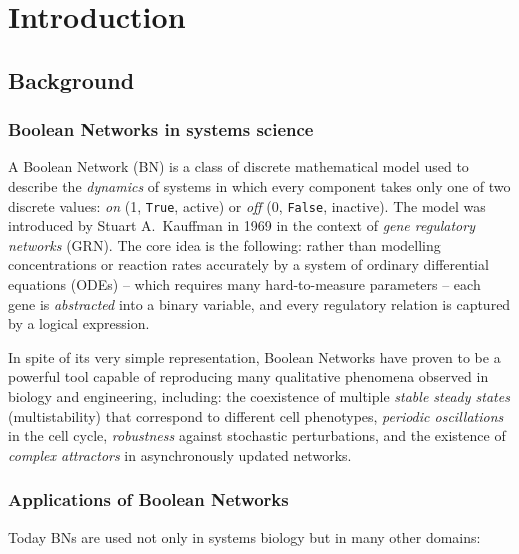\documentclass[oneside,final]{hcmut-report}
\begin{document}
  \cleardoublepage
  \listoffigures

  \cleardoublepage
  \listoftables
\endgroup

\cleardoublepage
\clearpage
{}
\setcounter{page}{1}

\section{Introduction}\label{sec:intro}

\subsection{Background}\label{subsec:background}

\subsubsection{Boolean Networks in systems science}
A Boolean Network (BN) is a class of discrete mathematical model used to describe the \textit{dynamics} of systems in which every component takes only one of two discrete values: \textit{on} (1, \texttt{True}, active) or \textit{off} (0, \texttt{False}, inactive). The model was introduced by Stuart A.\ Kauffman in 1969 \cite{kauffman1969metabolic} in the context of \textit{gene regulatory networks} (GRN). The core idea is the following: rather than modelling concentrations or reaction rates accurately by a system of ordinary differential equations (ODEs) -- which requires many hard-to-measure parameters -- each gene is \textit{abstracted} into a binary variable, and every regulatory relation is captured by a logical expression.

In spite of its very simple representation, Boolean Networks have proven to be a powerful tool capable of reproducing many qualitative phenomena observed in biology and engineering, including: the coexistence of multiple \textit{stable steady states} (multistability) that correspond to different cell phenotypes, \textit{periodic oscillations} in the cell cycle, \textit{robustness} against stochastic perturbations, and the existence of \textit{complex attractors} in asynchronously updated networks.

\subsubsection{Applications of Boolean Networks}
Today BNs are used not only in systems biology but in many other domains:
\end{document}
